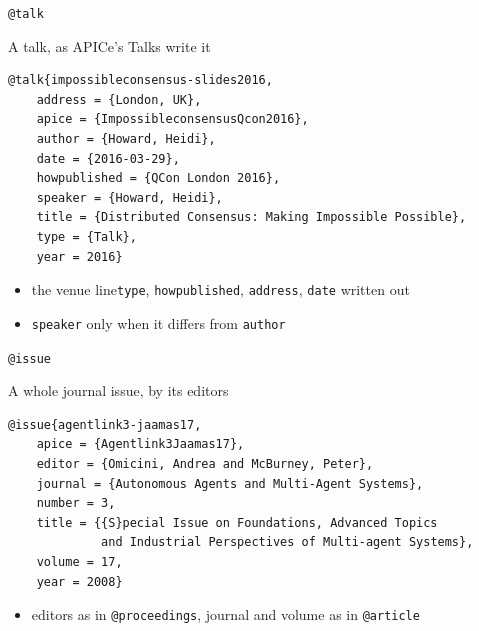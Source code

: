 \documentclass[presentation,\almamaterseal,apice]{beamer}\mode<presentation>{\usetheme{\almamaterpreset}}
\begin{document}
\begin{frame}[c,fragile]{\texttt{@talk}}
%
\begin{block}{A talk, as APICe's Talks write it}
{\scriptsize\begin{verbatim}
@talk{impossibleconsensus-slides2016,
    address = {London, UK},
    apice = {ImpossibleconsensusQcon2016},
    author = {Howard, Heidi},
    date = {2016-03-29},
    howpublished = {QCon London 2016},
    speaker = {Howard, Heidi},
    title = {Distributed Consensus: Making Impossible Possible},
    type = {Talk},
    year = 2016}
\end{verbatim}} %
\begin{itemize}
	\item the venue line\textemdash{}\texttt{type}, \texttt{howpublished}, \texttt{address}, \texttt{date} written out
	\item \texttt{speaker} only when it differs from \texttt{author}
\end{itemize}
\end{block}
%
\end{frame}

\begin{frame}[c,fragile]{\texttt{@issue}}
%
\begin{block}{A whole journal issue, by its editors}
{\scriptsize\begin{verbatim}
@issue{agentlink3-jaamas17,
    apice = {Agentlink3Jaamas17},
    editor = {Omicini, Andrea and McBurney, Peter},
    journal = {Autonomous Agents and Multi-Agent Systems},
    number = 3,
    title = {{S}pecial Issue on Foundations, Advanced Topics
             and Industrial Perspectives of Multi-agent Systems},
    volume = 17,
    year = 2008}
\end{verbatim}} %
\begin{itemize}
	\item editors as in \texttt{@proceedings}, journal and volume as in \texttt{@article}
\end{itemize}
\end{block}
%
\end{frame}
\end{document}
